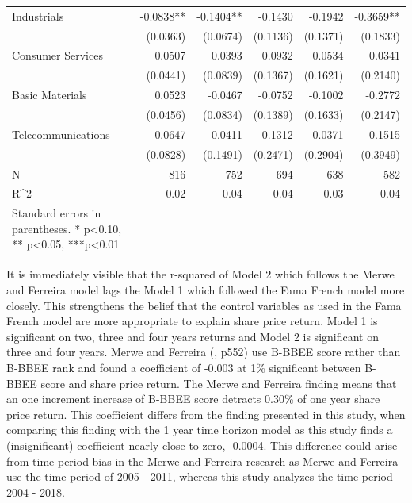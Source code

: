 \begin{table}[H]
{\begin{tabular}{lrrrrr}
Industrials        & -0.0838** & -0.1404** & -0.1430   & -0.1942   & -0.3659**  \\
                   & (0.0363)  & (0.0674)  & (0.1136)  & (0.1371)  & (0.1833)   \\
Consumer Services  & 0.0507    & 0.0393    & 0.0932    & 0.0534    & 0.0341     \\
                   & (0.0441)  & (0.0839)  & (0.1367)  & (0.1621)  & (0.2140)   \\
Basic Materials    & 0.0523    & -0.0467   & -0.0752   & -0.1002   & -0.2772    \\
                   & (0.0456)  & (0.0834)  & (0.1389)  & (0.1633)  & (0.2147)   \\
Telecommunications & 0.0647    & 0.0411    & 0.1312    & 0.0371    & -0.1515    \\
                   & (0.0828)  & (0.1491)  & (0.2471)  & (0.2904)  & (0.3949)   \\
N                  & 816       & 752       & 694       & 638       & 582        \\
R^2                 & 0.02      & 0.04      & 0.04      & 0.03      & 0.04       \\
   \bottomrule
Standard errors in parentheses.
* p<0.10, ** p<0.05, ***p<0.01
\end{tabular}}
\end{table} 
It is immediately visible that the r-squared of Model 2 which follows the Merwe and Ferreira model lags the Model 1 which followed the Fama French model more closely. This strengthens the belief that the control variables as used in the Fama French model are more appropriate to explain share price return. Model 1 is significant on two, three and four years returns and Model 2  is significant on three and four years. Merwe and Ferreira (\citeyear{N7}, p552) use B-BBEE score rather than B-BBEE rank and found a coefficient of -0.003 at 1\% significant between B-BBEE score and share price return. The Merwe and Ferreira finding means that an one increment increase of B-BBEE score detracts 0.30\% of one year share price return. This coefficient differs from the finding presented in this study, when comparing this finding with the 1 year time horizon model as this study finds a (insignificant) coefficient nearly close to zero, -0.0004. This difference could arise from time period bias in the Merwe and Ferreira research as Merwe and Ferreira use the time period of 2005 - 2011, whereas this study analyzes the time period 2004 - 2018.

